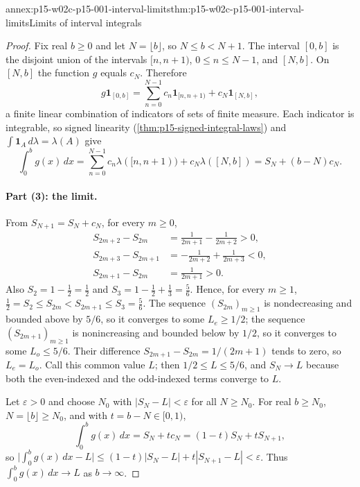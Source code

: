 \begin{annexitem}{annex:p15-w02c-p15-001-interval-limits}{thm:p15-w02c-p15-001-interval-limits}{Limits of interval integrals}
\begin{proof}
Fix real \(b\geq0\) and let \(N=\lfloor b\rfloor\), so
\(N\leq b<N+1\). The interval \([0,b]\) is the disjoint union of the
intervals \([n,n+1)\), \(0\leq n\leq N-1\), and \([N,b]\). On \([N,b]\)
the function \(g\) equals \(c_N\). Therefore
\[
 g\mathbf1_{[0,b]}
 =\sum_{n=0}^{N-1}c_n\mathbf1_{[n,n+1)}+c_N\mathbf1_{[N,b]},
\]
a finite linear combination of indicators of sets of finite measure. Each
indicator is integrable, so signed linearity
(\cref{thm:p15-signed-integral-laws}) and
\(\int\mathbf1_A\,d\lambda=\lambda(A)\) give
\[
 \int_0^bg(x)\,dx
 =\sum_{n=0}^{N-1}c_n\lambda([n,n+1))+c_N\lambda([N,b])
 =S_N+(b-N)c_N .
\]

\paragraph{Part (3): the limit.}
From \(S_{N+1}=S_N+c_N\), for every \(m\geq0\),
\[
 \begin{aligned}
 S_{2m+2}-S_{2m}&=\frac1{2m+1}-\frac1{2m+2}>0,\\
 S_{2m+3}-S_{2m+1}&=-\frac1{2m+2}+\frac1{2m+3}<0,\\
 S_{2m+1}-S_{2m}&=\frac1{2m+1}>0 .
 \end{aligned}
\]
Also \(S_2=1-\tfrac12=\tfrac12\) and
\(S_3=1-\tfrac12+\tfrac13=\tfrac56\). Hence, for every \(m\geq1\),
\(\tfrac12=S_2\leq S_{2m}<S_{2m+1}\leq S_3=\tfrac56\). The sequence
\((S_{2m})_{m\geq1}\) is nondecreasing and bounded above by \(5/6\), so
it converges to some \(L_e\geq1/2\); the sequence
\((S_{2m+1})_{m\geq1}\) is nonincreasing and bounded below by \(1/2\), so
it converges to some \(L_o\leq5/6\). Their difference
\(S_{2m+1}-S_{2m}=1/(2m+1)\) tends to zero, so \(L_e=L_o\). Call this
common value \(L\); then \(1/2\leq L\leq5/6\), and \(S_N\to L\) because
both the even-indexed and the odd-indexed terms converge to \(L\).

Let \(\varepsilon>0\) and choose \(N_0\) with \(|S_N-L|<\varepsilon\)
for all \(N\geq N_0\). For real \(b\geq N_0\), \(N=\lfloor b\rfloor\geq N_0\),
and with \(t=b-N\in[0,1)\),
\[
 \int_0^bg(x)\,dx=S_N+tc_N=(1-t)S_N+tS_{N+1},
\]
so
\(\bigl|\int_0^bg(x)\,dx-L\bigr|\leq(1-t)|S_N-L|+t|S_{N+1}-L|<\varepsilon\).
Thus \(\int_0^bg(x)\,dx\to L\) as \(b\to\infty\).


\end{proof}
\end{annexitem}
